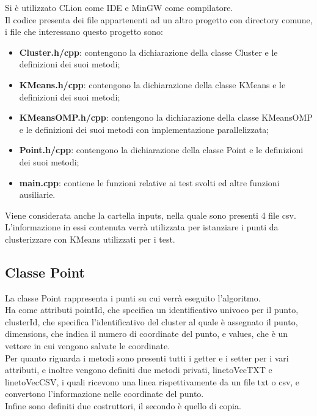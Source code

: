 \documentclass[10pt,twocolumn,letterpaper]{article}
\newcommand{\bit} {\begin{itemize} }
\newcommand{\eit} {\end{itemize} }
\begin{document}
Si è utilizzato CLion come IDE e MinGW come compilatore.\\
Il codice presenta dei file appartenenti ad un altro progetto con directory comune, i file che interessano questo progetto sono:

\bit
    \item{\textbf{Cluster.h/cpp}: contengono la dichiarazione della classe Cluster e le definizioni dei suoi metodi;}
    \item{\textbf{KMeans.h/cpp}: contengono la dichiarazione della classe KMeans e le definizioni dei suoi metodi;}
    \item{\textbf{KMeansOMP.h/cpp}: contengono la dichiarazione della classe KMeansOMP e le definizioni dei suoi metodi con implementazione parallelizzata;}
    \item{\textbf{Point.h/cpp}: contengono la dichiarazione della classe Point e le definizioni dei suoi metodi;}
    \item{\textbf{main.cpp}: contiene le funzioni relative ai test svolti ed altre funzioni ausiliarie.}
\eit

Viene considerata anche la cartella inputs, nella quale sono presenti 4 file csv. L'informazione in essi contenuta verrà utilizzata per istanziare i punti da clusterizzare con KMeans utilizzati per i test.

\subsection{Classe Point}
La classe Point rappresenta i punti su cui verrà eseguito l'algoritmo.\\
Ha come attributi pointId, che specifica un identificativo univoco per il punto, clusterId, che specifica l'identificativo del cluster al quale è assegnato il punto, dimensions, che indica il numero di coordinate del punto, e values, che è un vettore in cui vengono salvate le coordinate.\\
Per quanto riguarda i metodi sono presenti tutti i getter e i setter per i vari attributi, e inoltre vengono definiti due metodi privati, linetoVecTXT e linetoVecCSV, i quali ricevono una linea rispettivamente da un file txt o csv, e convertono l'informazione nelle coordinate del punto.\\
Infine sono definiti due costruttori, il secondo è quello di copia.
\end{document}
